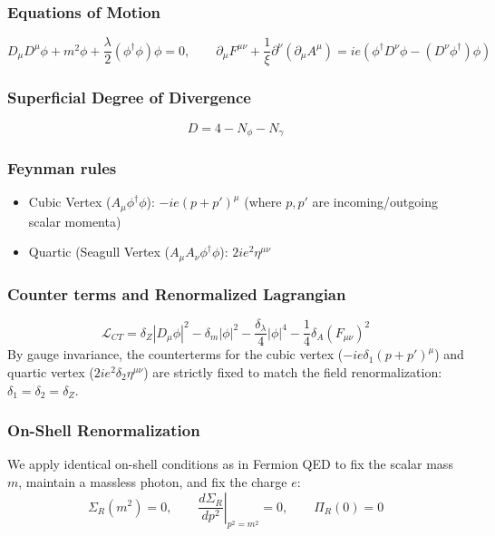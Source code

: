 \documentclass{article}
\begin{document}
\subsubsection*{Equations of Motion}
\begin{equation}
    D_\mu D^\mu \phi + m^2\phi + \frac{\lambda}{2}(\phi^\dagger \phi)\phi = 0, \qquad \partial_\mu F^{\mu\nu} + \frac{1}{\xi}\partial^\nu(\partial_\mu A^\mu) = ie(\phi^\dagger D^\nu \phi - (D^\nu\phi^\dagger)\phi)
\end{equation}
\subsubsection*{Superficial Degree of Divergence}
\begin{equation}
    D = 4 - N_\phi - N_\gamma
\end{equation}
\subsubsection*{Feynman rules}
\begin{itemize}
    \item Cubic Vertex ($A_\mu \phi^\dagger \phi$): $-ie(p + p')^\mu$ (where $p, p'$ are incoming/outgoing scalar momenta)
    \item Quartic (Seagull Vertex ($A_\mu A_\nu \phi^\dagger \phi$): $2ie^2\eta^{\mu\nu}$
\end{itemize}
\subsubsection*{Counter terms and Renormalized Lagrangian}
\begin{equation}
    \mathcal{L}_{CT} = \delta_Z |D_\mu \phi|^2 - \delta_m |\phi|^2 - \frac{\delta_\lambda}{4}|\phi|^4 - \frac{1}{4}\delta_A (F_{\mu\nu})^2
\end{equation}
By gauge invariance, the counterterms for the cubic vertex ($-ie\delta_1(p+p')^\mu$) and quartic vertex ($2ie^2\delta_2\eta^{\mu\nu}$) are strictly fixed to match the field renormalization: $\delta_1 = \delta_2 = \delta_Z$.
\subsubsection*{On-Shell Renormalization}
We apply identical on-shell conditions as in Fermion QED to fix the scalar mass $m$, maintain a massless photon, and fix the charge $e$:
\begin{equation}
    \Sigma_R(m^2) = 0, \qquad \left.\frac{d\Sigma_R}{dp^2}\right|_{p^2=m^2} = 0, \qquad \Pi_R(0) = 0
\end{equation}
\end{document}
